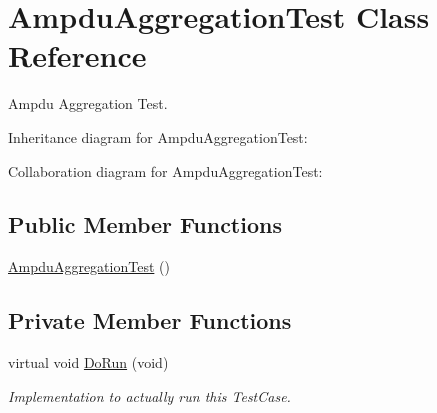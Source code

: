 \hypertarget{classAmpduAggregationTest}{}\section{Ampdu\+Aggregation\+Test Class Reference}
\label{classAmpduAggregationTest}


Ampdu Aggregation Test.  




Inheritance diagram for Ampdu\+Aggregation\+Test\+:


Collaboration diagram for Ampdu\+Aggregation\+Test\+:
\subsection*{Public Member Functions}
\begin{DoxyCompactItemize}
\item 
\hyperlink{classAmpduAggregationTest_a33d6ed639cf5e1bbcf0c4e3dd8f1079e}{Ampdu\+Aggregation\+Test} ()
\end{DoxyCompactItemize}
\subsection*{Private Member Functions}
\begin{DoxyCompactItemize}
\item 
virtual void \hyperlink{classAmpduAggregationTest_a7414dc8d4dd982ab4c1eaadb5b2c693d}{Do\+Run} (void)
\begin{DoxyCompactList}\small\item\em Implementation to actually run this Test\+Case. \end{DoxyCompactList}\end{DoxyCompactItemize}
